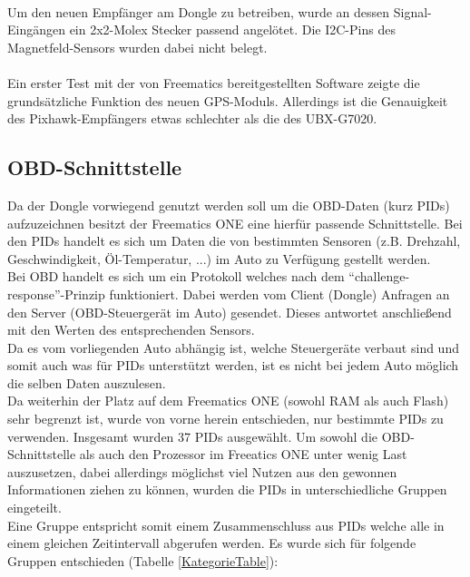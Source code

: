 \paragraph{}
Um den neuen Empfänger am Dongle zu betreiben, wurde an dessen Signal-Eingängen ein 2x2-Molex Stecker passend angelötet. Die I2C-Pins des Magnetfeld-Sensors wurden dabei nicht belegt.
\paragraph{}
Ein erster Test mit der von Freematics bereitgestellten Software zeigte die grundsätzliche Funktion des neuen GPS-Moduls. Allerdings ist die Genauigkeit des Pixhawk-Empfängers etwas schlechter als die des UBX-G7020.

	\subsection{ \ac{OBD}-Schnittstelle}
		Da der Dongle vorwiegend genutzt werden soll um die \ac{OBD}-Daten (kurz \acp{PID}) aufzuzeichnen besitzt der Freematics ONE eine hierfür passende Schnittstelle. Bei den \acp{PID}\cite{OBD-2.net2018} handelt es sich um Daten die von bestimmten Sensoren (z.B. Drehzahl, Geschwindigkeit, Öl-Temperatur, ...) im Auto zu Verfügung gestellt werden.
		\ \\
		Bei \ac{OBD} handelt es sich um ein Protokoll welches nach dem \enquote{challenge-response}-Prinzip funktioniert. Dabei werden vom Client (Dongle) Anfragen an den Server (\ac{OBD}-Steuergerät im Auto) gesendet. Dieses antwortet anschließend mit den Werten des entsprechenden Sensors.
		\ \\
		Da es vom vorliegenden Auto abhängig ist, welche Steuergeräte verbaut sind und somit auch was für \acp{PID} unterstützt werden, ist es nicht bei jedem Auto möglich die selben Daten auszulesen.
		\ \\
		Da weiterhin der Platz auf dem Freematics ONE (sowohl RAM als auch Flash) sehr begrenzt ist, wurde von vorne herein entschieden, nur bestimmte \acp{PID} zu verwenden. Insgesamt wurden 37 \acp{PID} ausgewählt. Um sowohl die \ac{OBD}-Schnittstelle als auch den Prozessor im Freeatics ONE unter wenig Last auszusetzen, dabei allerdings möglichst viel Nutzen aus den gewonnen Informationen ziehen zu können, wurden die \acp{PID} in unterschiedliche Gruppen eingeteilt. 
		\ \\
		Eine Gruppe entspricht somit einem Zusammenschluss aus \acp{PID} welche alle in einem gleichen Zeitintervall abgerufen werden. Es wurde sich für folgende Gruppen entschieden (Tabelle \ref{KategorieTable}):
		
